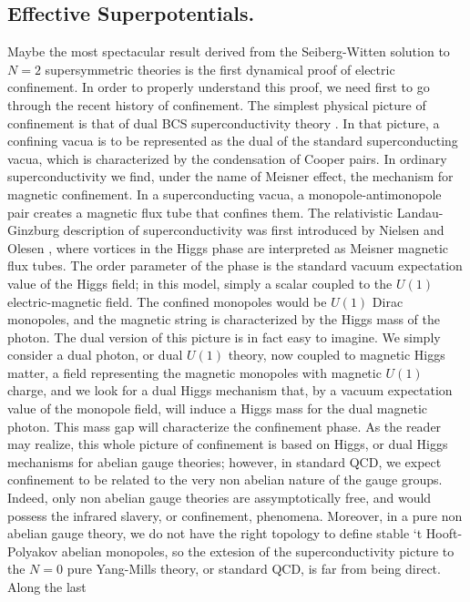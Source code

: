 \subsection{Effective Superpotentials.}

Maybe the most spectacular result derived from the Seiberg-Witten
solution to $N\!=\!2$ supersymmetric theories is the first
dynamical proof of electric confinement. In order to properly
understand this proof, we need first to go through the recent
history of confinement. The simplest physical picture of
confinement is that of dual BCS superconductivity theory \cite{P3d,Man,tHconf}. In that
picture, a confining vacua is to be represented as the dual of
the standard superconducting vacua, which is characterized by the
condensation of Cooper pairs. In ordinary
superconductivity we find, under the name of Meisner effect, the
mechanism for magnetic confinement. In a superconducting vacua, a
monopole-antimonopole pair creates a magnetic flux
tube that confines them. The relativistic Landau-Ginzburg
description of superconductivity was first introduced by Nielsen
and Olesen \cite{NO}, where vortices in the Higgs phase are interpreted as
Meisner magnetic flux tubes. The order parameter of
the phase is the standard vacuum expectation value of the Higgs
field; in this model, simply a scalar coupled to the $U(1)$
electric-magnetic field. The confined monopoles would be $U(1)$
Dirac monopoles, and the magnetic string is characterized by the
Higgs mass of the photon. The dual version of this picture is in
fact easy to imagine. We simply consider a dual photon, or
dual $U(1)$ theory, now coupled to magnetic Higgs matter, a field
representing the magnetic monopoles with magnetic $U(1)$ charge,
and we look for a dual Higgs mechanism that, by a vacuum
expectation value of the monopole field, will induce a Higgs mass
for the dual magnetic photon. This mass gap will characterize the
confinement phase. As the reader may realize, this whole picture
of confinement is based on Higgs, or dual Higgs mechanisms for
abelian gauge theories; however, in standard QCD, we expect
confinement to be related to the very non abelian nature of the
gauge groups. Indeed, only non abelian gauge theories are
assymptotically free, and would possess the infrared slavery,
or confinement, phenomena. Moreover, in a pure non abelian gauge
theory, we do not have the right topology to define stable `t
Hooft-Polyakov abelian monopoles, so the extesion of the
superconductivity picture to the $N\!=\!0$ pure Yang-Mills
theory, or standard QCD, is far from being direct. Along the last

